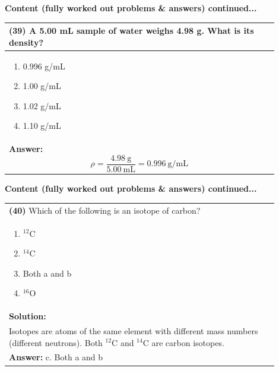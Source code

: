 \documentclass{article}
\begin{document}
\newpage
\noindent
{\large\textbf{Content (fully worked out problems \& answers) continued...}}\\[0.2em]
\vspace{0.2cm}
\begin{tabular}{|p{0.9\linewidth}|}
\hline
\vspace{0.2cm}
\textbf{(39)} A 5.00 mL sample of water weighs 4.98 g. What is its density?\\
\hline
\vspace{0.2cm}
\begin{minipage}[t]{0.85\linewidth}
\begin{enumerate}[label=\alph*.]
\item 0.996 g/mL \
\item 1.00 g/mL \
\item 1.02 g/mL \ 
\item 1.10 g/mL 
\end{enumerate}
\end{minipage}\\
\hline
\vspace{0.2cm}
\textbf{Answer:} 
\[
\rho = \frac{4.98~\text{g}}{5.00~\text{mL}} = 0.996~\text{g/mL}
\] \\ 
\hline
\end{tabular}
\newpage

\noindent
{\large\textbf{Content (fully worked out problems \& answers) continued...}}\\[0.2em]
\vspace{0.2cm}
\begin{tabular}{|p{0.9\linewidth}|}
\hline
\vspace{0.2cm}
\textbf{(40)} Which of the following is an isotope of carbon? \\
\begin{minipage}[t]{0.85\linewidth}
\begin{enumerate}[label=\alph*.]
\item $^{12}$C \
\item $^{14}$C \
\item Both a and b \ 
\item $^{16}$O 
\end{enumerate}
\end{minipage}\\
\hline
\vspace{0.2cm}
\textbf{Solution:} \\
Isotopes are atoms of the same element with different mass numbers (different neutrons). Both $^{12}$C and $^{14}$C are carbon isotopes. \\
\hline
\vspace{0.2cm}
\textbf{Answer:} c. Both a and b \\
\hline
\end{tabular}
\newpage
\end{document}
